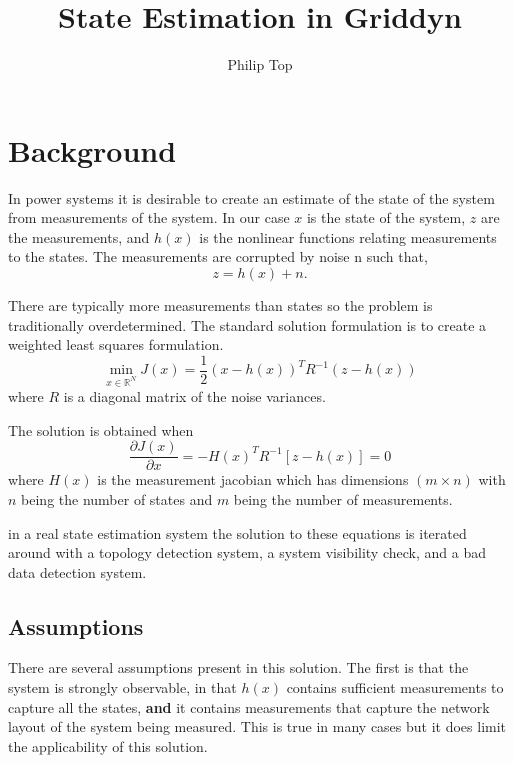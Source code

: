 \documentclass[11pt]{article} %
\title{State Estimation in Griddyn}
\author{Philip Top}
\date{} %
\begin{document}
\maketitle

\section{Background}

In power systems it is desirable to create an estimate of the state of the system from measurements of the system.  In our case $x$ is the state of the system,  $z$ are the measurements, and $h(x)$ is the nonlinear functions relating measurements to the states.  The measurements are corrupted by noise n such that,
\begin{equation}
z=h(x)+n.
\end{equation}

There are typically more measurements than states so the problem is traditionally overdetermined.
The standard solution formulation is to create a weighted least squares formulation.
\begin{equation}
\min_{x \in \mathbb{R}^N} J(x)=\frac{1}{2}\left(x-h(x)\right)^T R^{-1}\left (z-h(x)\right)
\end{equation}
where $R$ is a diagonal matrix of the noise variances.

The solution is obtained when 
\begin{equation} \label{Eq:sol1}
\frac{\partial J(x)}{\partial x} = -H(x)^T R^{-1} \left[z-h(x)\right] = 0
\end{equation}
where $H(x)$ is the measurement jacobian which has dimensions $(m \times n)$ with $n$ being the number of states and $m$ being the number of measurements.

in a real state estimation system the solution to these equations is iterated around with a topology detection system, a system visibility check, and a bad data detection system.  

\subsection{Assumptions}
There are several assumptions present in this solution.  
The first is that the system is strongly observable, in that $h(x)$ contains sufficient measurements to capture all the states, \textbf{and} it contains measurements that capture the network layout of the system being measured.  This is true in many cases but it does limit the applicability of this solution.  
\end{document}
